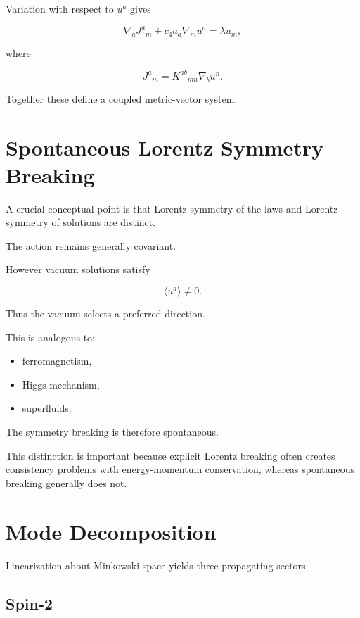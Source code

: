 Variation with respect to $u^a$ gives

\begin{equation}
\nabla_a J^a{}_m
+
c_4 a_a\nabla_m u^a
=
\lambda u_m ,
\end{equation}

where

\begin{equation}
J^a{}_m
=
K^{ab}{}_{mn}
\nabla_b u^n.
\end{equation}

Together these define a coupled metric-vector system.

\section{Spontaneous Lorentz Symmetry Breaking}

A crucial conceptual point is that Lorentz symmetry of the laws
and Lorentz symmetry of solutions are distinct.

The action remains generally covariant.

However vacuum solutions satisfy

\begin{equation}
\langle u^a\rangle \neq 0.
\end{equation}

Thus the vacuum selects a preferred direction.

This is analogous to:

\begin{itemize}
\item ferromagnetism,
\item Higgs mechanism,
\item superfluids.
\end{itemize}

The symmetry breaking is therefore spontaneous.

This distinction is important because explicit Lorentz breaking often
creates consistency problems with energy-momentum conservation,
whereas spontaneous breaking generally does not.

\section{Mode Decomposition}

Linearization about Minkowski space yields three propagating sectors.

\subsection{Spin-2}

